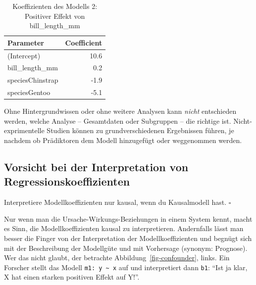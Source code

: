 \documentclass[
  letterpaper,
  twoside,
  open=any]{scrbook}
\theoremstyle{definition}
\theoremstyle{definition}
\theoremstyle{definition}
\theoremstyle{remark}
\begin{document}
\begin{longtable}[]{@{}lr@{}}

\caption{\label{tbl-peng-simpson2}Koeffizienten des Modells 2: Positiver
Effekt von bill\_length\_mm}

\tabularnewline

\toprule\noalign{}
Parameter & Coefficient \\
\midrule\noalign{}
\endhead
\bottomrule\noalign{}
\endlastfoot
(Intercept) & 10.6 \\
bill\_length\_mm & 0.2 \\
speciesChinstrap & -1.9 \\
speciesGentoo & -5.1 \\

\end{longtable}

Ohne Hintergrundwissen oder ohne weitere Analysen kann \emph{nicht}
entschieden werden, welche Analyse -- Gesamtdaten oder Subgruppen -- die
richtige ist. Nicht-exprimentelle Studien können zu grundverschiedenen
Ergebnissen führen, je nachdem ob Prädiktoren dem Modell hinzugefügt
oder weggenommen werden.

\subsection{Vorsicht bei der Interpretation von
Regressionskoeffizienten}\label{vorsicht-bei-der-interpretation-von-regressionskoeffizienten}

\begin{tcolorbox}[enhanced jigsaw, colframe=quarto-callout-important-color-frame, arc=.35mm, leftrule=.75mm, bottomtitle=1mm, titlerule=0mm, colbacktitle=quarto-callout-important-color!10!white, breakable, bottomrule=.15mm, colback=white, left=2mm, rightrule=.15mm, opacityback=0, toptitle=1mm, toprule=.15mm, opacitybacktitle=0.6, title=\textcolor{quarto-callout-important-color}{\faExclamation}\hspace{0.5em}{Wichtig}, coltitle=black]

Interpretiere Modellkoeffizienten nur kausal, wenn du Kausalmodell hast.
\(\square\)

\end{tcolorbox}

Nur wenn man die Ursache-Wirkungs-Beziehungen in einem System kennt,
macht es Sinn, die Modellkoeffizienten kausal zu interpretieren.
Andernfalls lässt man besser die Finger von der Interpretation der
Modellkoeffizienten und begnügt sich mit der Beschreibung der Modellgüte
und mit Vorhersage (synonym: Prognose). Wer das nicht glaubt, der
betrachte Abbildung~\ref{fig-confounder}, links. Ein Forscher stellt das
Modell \texttt{m1:\ y\ \textasciitilde{}\ x} auf und interpretiert dann
\texttt{b1}: \enquote{Ist ja klar, X hat einen starken positiven Effekt
auf Y!}.
\end{document}
